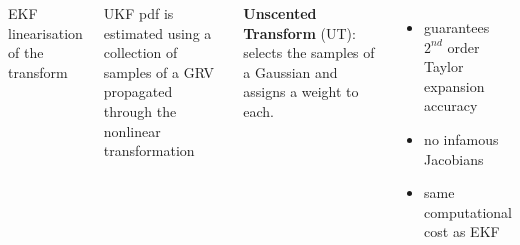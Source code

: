 \begin{frame}
\begin{columns}
\vspace{-10pt}
\begin{columns}
\begin{block}{EKF}
{\scriptsize linearisation of the transform}
\end{block}
%
\begin{block}{UKF}
{\scriptsize pdf is estimated using a collection of samples of a GRV propagated through the nonlinear transformation}
\end{block}
%
\end{columns}
\vspace{5pt}
\textbf{Unscented Transform} (UT): selects the samples of a Gaussian and assigns a weight to each. 
	\begin{itemize}
		\item {\footnotesize guarantees $2^{nd}$ order Taylor expansion accuracy \cite{julier96}} 
		\item {\footnotesize no infamous Jacobians} 
		\item {\footnotesize same computational cost as EKF} 
	\end{itemize}	
\end{columns}
\end{frame}